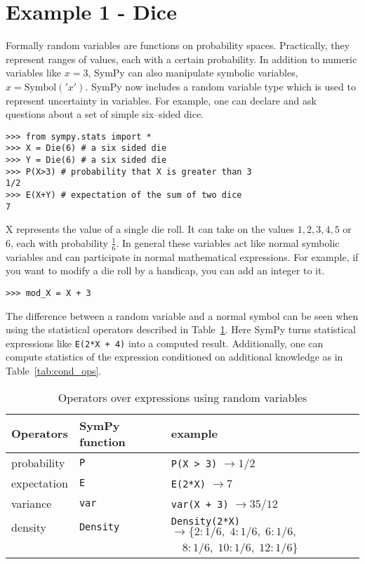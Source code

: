 \section{Example 1 - Dice}

Formally random variables are functions on probability spaces.  Practically,
they represent ranges of values, each with a certain probability.  In addition
to numeric variables like $x = 3$, SymPy can also manipulate symbolic
variables, $x = \text{Symbol}('x')$. SymPy now includes a random variable type
which is used to represent uncertainty in variables.  For example, one can
declare and ask questions about a set of simple six--sided dice.

\begin{lstlisting}
>>> from sympy.stats import *
>>> X = Die(6) # a six sided die
>>> Y = Die(6) # a six sided die
>>> P(X>3) # probability that X is greater than 3
1/2
>>> E(X+Y) # expectation of the sum of two dice
7
\end{lstlisting}

X represents the value of a single die roll. It can take on the values
$1,2,3,4,5$ or $6$, each with probability $\frac{1}{6}$. In general these
variables act like normal symbolic variables and can participate in normal
mathematical expressions. For example, if you want to modify a die roll by a
handicap, you can add an integer to it.

\begin{lstlisting}
>>> mod_X = X + 3
\end{lstlisting}

The difference between a random variable and a normal symbol can be seen when
using the statistical operators described in Table~\ref{tab:stat_ops}.  Here
SymPy turns statistical expressions like {\tt E(2*X + 4)} into a computed
result. Additionally, one can compute statistics of the expression conditioned
on additional knowledge as in Table~\ref{tab:cond_ops}.

\begin{table}[h]
\begin{tabular}{|lll|}
\hline
Operators & SymPy function & example\\ \hline
probability & {\tt P} & {\tt P(X > 3)}  $\rightarrow 1/2$\\ \hline
expectation & {\tt E} & {\tt E(2*X)} $\rightarrow 7$ \\ \hline
variance & {\tt var} & {\tt var(X + 3)} $\rightarrow 35/12$\\ \hline
density & {\tt Density} & {\tt Density(2*X)}  $\rightarrow \{2: 1/6,\; 4: 1/6,\; 6: 1/6,$ \\
            & & \phantom{Density(X+3) $\rightarrow$} $\quad 8: 1/6,\; 10: 1/6,\; 12: 1/6\}$ \\ \hline
\end{tabular}
\caption{Operators over expressions using random variables}
\label{tab:stat_ops}
\end{table}

